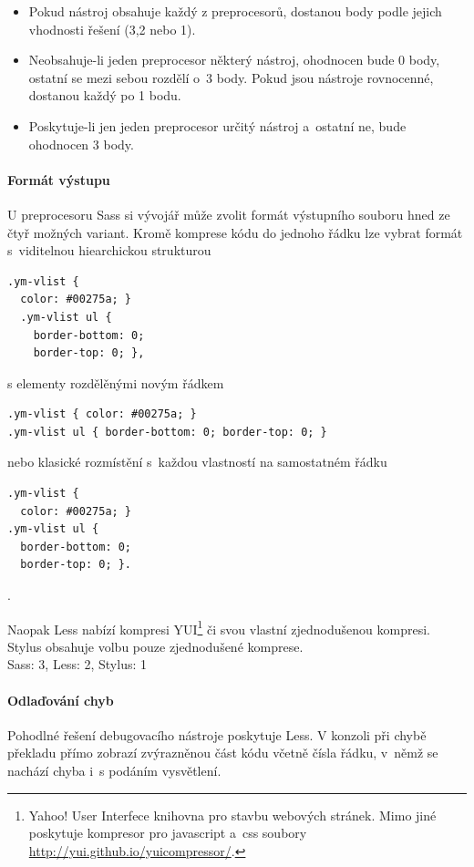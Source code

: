 \documentclass[thesis=B,czech]{FITthesis}[2012/06/26]
\begin{document}
\begin{itemize}
 \item Pokud nástroj obsahuje každý z preprocesorů, dostanou body podle jejich vhodnosti řešení (3,2 nebo 1). 
 \item Neobsahuje-li jeden preprocesor některý nástroj, ohodnocen bude 0 body, ostatní se mezi sebou rozdělí o~3 body. Pokud jsou nástroje rovnocenné, dostanou každý po 1 bodu.
 \item Poskytuje-li jen jeden preprocesor určitý nástroj a~ostatní ne, bude ohodnocen 3 body. 
\end{itemize}

\paragraph{Formát výstupu}

 U preprocesoru Sass si vývojář může zvolit formát výstupního souboru hned ze čtyř možných variant. Kromě komprese kódu do jednoho řádku lze vybrat formát s~viditelnou hiearchickou strukturou
\scriptsize
\begin{verbatim}
.ym-vlist {
  color: #00275a; }
  .ym-vlist ul {
    border-bottom: 0;
    border-top: 0; },
\end{verbatim}
\normalsize
s elementy rozdělěnými novým řádkem 
\scriptsize
\begin{verbatim}
.ym-vlist { color: #00275a; }
.ym-vlist ul { border-bottom: 0; border-top: 0; }
\end{verbatim}
\normalsize
nebo klasické rozmístění s~každou vlastností na samostatném řádku
\scriptsize
\begin{verbatim}
.ym-vlist {
  color: #00275a; }
.ym-vlist ul {
  border-bottom: 0;
  border-top: 0; }.
\end{verbatim}
\normalsize.

Naopak Less nabízí kompresi YUI\footnote{Yahoo! User Interfece knihovna pro stavbu webových stránek. Mimo jiné poskytuje kompresor pro javascript a~css soubory \url{http://yui.github.io/yuicompressor/}.} či svou vlastní zjednodušenou kompresi. Stylus obsahuje volbu pouze zjednodušené komprese.\\
Sass: 3, Less: 2, Stylus: 1

\paragraph{Odlaďování chyb}

Pohodlné řešení debugovacího nástroje poskytuje Less. V konzoli při chybě překladu přímo zobrazí zvýrazněnou část kódu včetně čísla řádku, v~němž se nachází chyba i~s podáním vysvětlení. 
\end{document}
